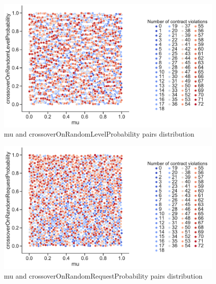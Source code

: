 \clearpage
\begin{figure}
	\centering
	\includegraphics[width=\textwidth]{images/PairsDistr/mu_crossoverOnRandomLevelProbability.pdf}
	\caption[mu and crossoverOnRandomLevelProbability pairs distribution]{mu and crossoverOnRandomLevelProbability pairs distribution}
	\label{fig:mu_crossoverOnRandomLevelProbability_pair}
\end{figure}
\clearpage
\begin{figure}
	\centering
	\includegraphics[width=\textwidth]{images/PairsDistr/mu_crossoverOnRandomRequestProbability.pdf}
	\caption[mu and crossoverOnRandomRequestProbability pairs distribution]{mu and crossoverOnRandomRequestProbability pairs distribution}
	\label{fig:mu_crossoverOnRandomRequestProbability_pair}
\end{figure}
\clearpage
